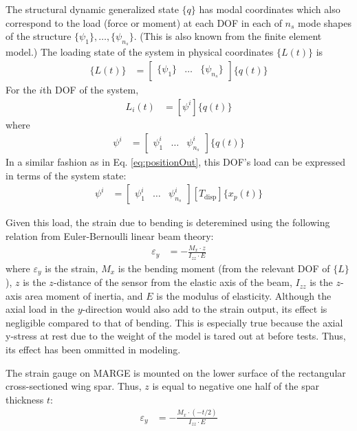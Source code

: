 The structural dynamic generalized state $\{q\}$ has modal coordinates which also correspond to the load (force or moment) at each DOF in each of $n_s$ mode shapes of the structure $\{\psi_1\}, \dots, \{\psi_{n_s}\}$. (This is also known from the finite element model.) The loading state of the system in physical coordinates $\{L(t)\}$ is
\begin{align}
	\{L(t)\} &= \begin{bmatrix} \{\psi_1\} & \dots & \{\psi_{n_s}\} \end{bmatrix} \{q(t)\}
\end{align}
For the $i$th DOF of the system,
\begin{align}
	L_i(t) &= [\psi^i] \{q(t)\}
\end{align}
where
\begin{align}
	\psi^i &= \begin{bmatrix} \psi_1^i & \dots & \psi_{n_s}^i \end{bmatrix} \{q(t)\}
\end{align}
In a similar fashion as in Eq. \ref{eq:positionOut}, this DOF's load can be expressed in terms of the system state:
\begin{align}
	\label{eq:loadOut}
	\psi^i &= \begin{bmatrix} \psi_1^i & \dots & \psi_{n_s}^i \end{bmatrix} [T_\text{disp}] \{x_p(t)\}
\end{align}

Given this load, the strain due to bending is deteremined using the following relation from Euler-Bernoulli linear beam theory:
\begin{align}
	\label{eq:beamTheory}
	\varepsilon_{y} &= -\frac{M_x \cdot z}{I_{zz} \cdot E}
\end{align}
where $\varepsilon_y$ is the strain, $M_x$ is the bending moment (from the relevant DOF of $\{L\}$), $z$ is the $z$-distance of the sensor from the elastic axis of the beam, $I_{zz}$ is the $z$-axis area moment of inertia, and $E$ is the modulus of elasticity. Although the axial load in the $y$-direction would also add to the strain output, its effect is negligible compared to that of bending. This is especially true because the axial y-stress at rest due to the weight of the model is tared out at before tests. Thus, its effect has been ommitted in modeling.

The strain gauge on MARGE is mounted on the lower surface of the rectangular cross-sectioned wing spar.  Thus, $z$ is equal to negative one half of the spar thickness $t$:
\begin{align}
	\varepsilon_{y} &= -\frac{M_x \cdot (-t/2)}{I_{zz} \cdot E}
\end{align}

